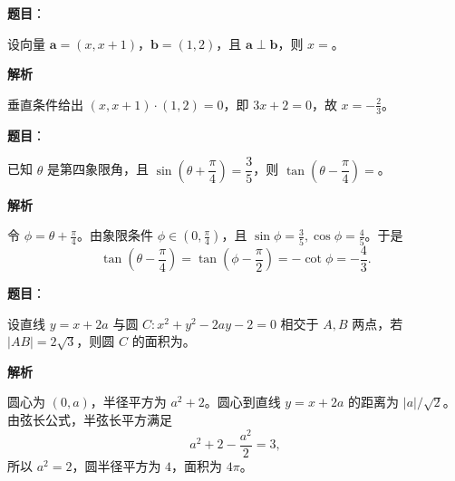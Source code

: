 \begin{answer}

\textbf{题目}：

设向量 \(\boldsymbol{a}=(x,x+1)\)，\(\boldsymbol{b}=(1,2)\)，且 \(\boldsymbol{a}\perp\boldsymbol{b}\)，则 \(x=\)\gkblank{}。

\textbf{解析}

垂直条件给出 \((x,x+1)\cdot(1,2)=0\)，即 \(3x+2=0\)，故 \(x=-\frac23\)。


\end{answer}
\begin{answer}

\textbf{题目}：

已知 \(\theta\) 是第四象限角，且 \(\sin\left(\theta+\dfrac{\pi}{4}\right)=\dfrac{3}{5}\)，则 \(\tan\left(\theta-\dfrac{\pi}{4}\right)=\)\gkblank{}。

\textbf{解析}

令 \(\phi=\theta+\frac\pi4\)。由象限条件 \(\phi\in(0,\frac\pi4)\)，且 \(\sin\phi=\frac35,\cos\phi=\frac45\)。于是
\nopagebreak[4]
\[
\tan(\theta-\frac\pi4)=\tan(\phi-\frac\pi2)=-\cot\phi=-\frac43.
\]


\end{answer}
\begin{answer}

\textbf{题目}：

设直线 \(y=x+2a\) 与圆 \(C:x^2+y^2-2ay-2=0\) 相交于 \(A,B\) 两点，若 \(|AB|=2\sqrt{3}\)，则圆 \(C\) 的面积为\gkblank{}。

\textbf{解析}

圆心为 \((0,a)\)，半径平方为 \(a^2+2\)。圆心到直线 \(y=x+2a\) 的距离为 \(|a|/\sqrt2\)。由弦长公式，半弦长平方满足
\nopagebreak[4]
\[
a^2+2-\frac{a^2}{2}=3,
\]
所以 \(a^2=2\)，圆半径平方为 \(4\)，面积为 \(4\pi\)。


\end{answer}
